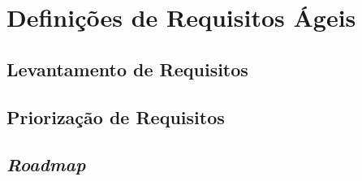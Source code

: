 \chapter[Definições de Requisitos Ágeis]{Definições de Requisitos Ágeis}
\label{chap:requisitos}
	\section[Levantamento de Requisitos]{Levantamento de Requisitos}
	\label{sec:requisitos_levantamento}
		

	\section[Priorização de Requisitos]{Priorização de Requisitos}
	\label{sec:requisitos_priorizacao}
		

	\section[\emph{Roadmap}]{\emph{Roadmap}}
	\label{sec:requisitos_roadmap}
		